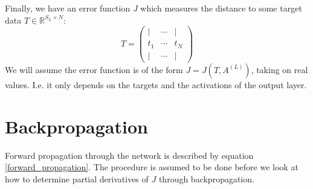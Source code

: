 \documentclass[12pt, a4paper]{article}
\numberwithin{equation}{section}
\begin{document}
Finally, we have an error function $J$ which measures the distance to some target data $T\in\mathbb{R}^{S_L\times N}$:
\begin{equation}
T=
\begin{pmatrix}
| & \cdots & | \\
t_1 & \cdots & t_N \\
| & \cdots & |
\end{pmatrix}
\end{equation}
We will assume the error function is of the form $J=J(T,A^{(L)})$, taking on real values. I.e. it only depends on the targets and the activations of the output layer.

\section{Backpropagation}
Forward propagation through the network is described by equation \ref{forward_propagation}. The procedure is assumed to be done before we look at how to determine partial derivatives of $J$ through backpropagation.
\end{document}
